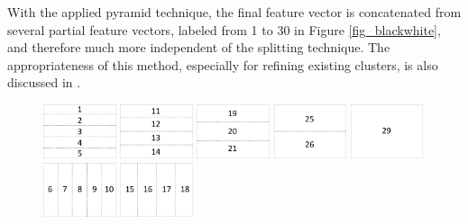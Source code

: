 With the applied pyramid technique, the final feature vector is concatenated from several partial feature vectors, labeled from 1 to 30 in Figure \ref{fig_blackwhite}, and therefore much more independent of the splitting technique. The appropriateness of this method, especially for refining existing clusters, is also discussed in \cite{Lazebnik2006}.

\begin{figure}[h]
\centering
\includegraphics[width=0.19\textwidth]{images/partitioning5h.pdf}
\includegraphics[width=0.19\textwidth]{images/partitioning4h.pdf}
\includegraphics[width=0.19\textwidth]{images/partitioning3h.pdf}
\includegraphics[width=0.19\textwidth]{images/partitioning2h.pdf}
\includegraphics[width=0.19\textwidth]{images/partitioning1h.pdf}\vspace{1mm}
\includegraphics[width=0.19\textwidth]{images/partitioning5v.pdf}
\includegraphics[width=0.19\textwidth]{images/partitioning4v.pdf}

\end{figure}
